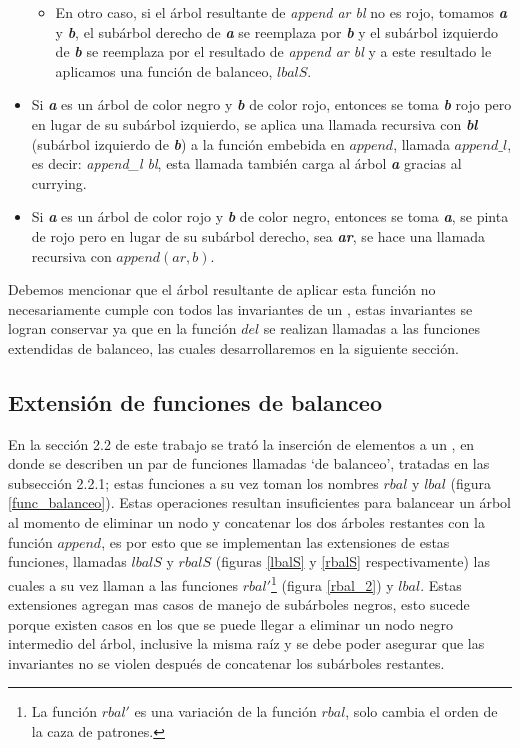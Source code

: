 \begin{itemize}
\begin{itemize}
      \item En otro caso, si el \'arbol resultante de \textit{append ar bl} no es rojo, tomamos 
      \textbf{\textit{a}} y \textbf{\textit{b}}, el subárbol derecho de \textbf{\textit{a}} se 
      reemplaza por \textbf{\textit{b}} y el subárbol izquierdo de \textbf{\textit{b}} se reemplaza 
      por el resultado de \textit{append ar bl} y a este resultado le aplicamos una función de 
      balanceo, $lbalS$.
    \end{itemize}
    \item Si \textbf{\textit{a}} es un \'arbol de color negro y \textbf{\textit{b}} de color rojo,
    entonces se toma \textbf{\textit{b}} rojo pero en lugar de su subárbol izquierdo, 
    se aplica una llamada recursiva con \textbf{\textit{bl}} (sub\'arbol izquierdo de \textbf{\textit{b}}) a la 
    funci\'on embebida en $append$, llamada $append\_l$, es decir: \textit{append\_l bl}, esta 
    llamada tambi\'en carga al \'arbol \textbf{\textit{a}} gracias al currying\cite{Currying}.
    \item Si \textbf{\textit{a}} es un \'arbol de color rojo y \textbf{\textit{b}} de color negro,
    entonces se toma \textbf{\textit{a}}, se pinta de rojo pero en lugar de su subárbol derecho, sea
    \textbf{\textit{ar}}, se hace una llamada recursiva con $append(ar,b)$.
\end{itemize}

Debemos mencionar que el \'arbol resultante de aplicar esta funci\'on no necesariamente cumple con todos las
invariantes de un {\arn}, estas invariantes se logran conservar ya que en la funci\'on $del$ se
realizan llamadas a las funciones extendidas de balanceo, las cuales desarrollaremos en la
siguiente sección.

\subsection{Extensi\'on de funciones de balanceo}

En la secci\'on 2.2 de este trabajo se trat\'o la inserci\'on de elementos a un {\arn}, en donde se
describen un par de funciones llamadas `de balanceo', tratadas en las subsecci\'on
2.2.1; estas funciones a su vez toman los nombres $rbal$ y $lbal$ (figura \ref{func_balanceo}).
Estas operaciones resultan insuficientes para balancear un \'arbol al momento de eliminar un nodo y
concatenar los dos \'arboles restantes con la función $append$, es por esto que se implementan las
extensiones de estas funciones, llamadas $lbalS$ y $rbalS$ (figuras \ref{lbalS} y \ref{rbalS}
respectivamente) las cuales a su vez llaman a las funciones $rbal'$\footnote{La funci\'on $rbal'$
es una variación de la función $rbal$, solo cambia el orden de la caza de patrones.} (figura
\ref{rbal_2}) y $lbal$. Estas extensiones agregan mas casos de manejo de subárboles negros, esto
sucede porque existen casos en los que se puede llegar a eliminar un nodo negro intermedio del \'arbol,
inclusive la misma ra\'iz y se debe poder asegurar que las invariantes no se violen después 
de concatenar los subárboles restantes.

